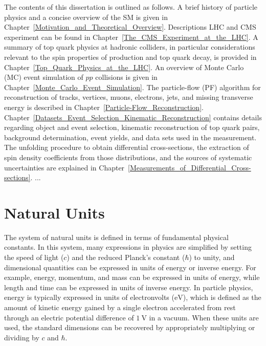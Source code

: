 The contents of this dissertation is outlined as follows.
A brief history of particle physics and a concise overview of the SM is given in Chapter~\ref{Motivation_and_Theoretical_Overview}.
Descriptions LHC and CMS experiment can be found in Chapter~\ref{The_CMS_Experiment_at_the_LHC}.
A summary of top quark physics at hadronic colliders, in particular considerations relevant to the spin properties of \ttbar production and top quark decay, is provided in Chapter~\ref{Top_Quark_Physics_at_the_LHC}. 
An overview of Monte Carlo (MC) event simulation of $pp$ collisions is given in Chapter~\ref{Monte_Carlo_Event_Simulation}.
The particle-flow (PF) algorithm for reconstruction of tracks, vertices, muons, electrons, jets, and missing transverse energy is described in Chapter~\ref{Particle-Flow_Reconstruction}.
Chapter~\ref{Datasets_Event_Selection_Kinematic_Reconstruction} contains details regarding object and event selection, kinematic reconstruction of top quark pairs, background determination, event yields, and data sets used in the measurement.
The unfolding procedure to obtain differential cross-sections, the extraction of spin density coefficients from those distributions, and the sources of systematic uncertainties are explained in Chapter~\ref{Measurements_of_Differential_Cross-sections}.
...

\section{Natural Units}
The system of natural units is defined in terms of fundamental physical constants.
In this system, many expressions in physics are simplified by setting the speed of light ($c$) and the reduced Planck's constant ($\hbar$) to unity, and dimensional quantities can be expressed in units of energy or inverse energy.
For example, energy, momentum, and mass can be expressed in units of energy, while length and time can be expressed in units of inverse energy.
In particle physics, energy is typically expressed in units of electronvolts ($\si{\eV}$), which is defined as the amount of kinetic energy gained by a single electron accelerated from rest through an electric potential difference of $\SI{1}{\V}$ in a vacuum.
When these units are used, the standard dimensions can be recovered by appropriately multiplying or dividing by $c$ and $\hbar$.